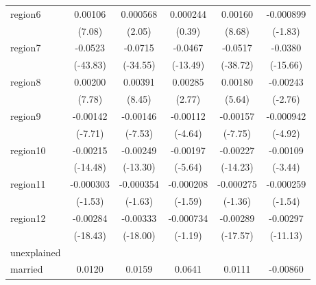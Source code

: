 \begin{table}[htbp]
\begin{tabular}{l*{5}{c}}
region6     &     0.00106\sym{***}&    0.000568\sym{*}  &    0.000244         &     0.00160\sym{***}&   -0.000899         \\
            &      (7.08)         &      (2.05)         &      (0.39)         &      (8.68)         &     (-1.83)         \\
region7     &     -0.0523\sym{***}&     -0.0715\sym{***}&     -0.0467\sym{***}&     -0.0517\sym{***}&     -0.0380\sym{***}\\
            &    (-43.83)         &    (-34.55)         &    (-13.49)         &    (-38.72)         &    (-15.66)         \\
region8     &     0.00200\sym{***}&     0.00391\sym{***}&     0.00285\sym{**} &     0.00180\sym{***}&    -0.00243\sym{**} \\
            &      (7.78)         &      (8.45)         &      (2.77)         &      (5.64)         &     (-2.76)         \\
region9     &    -0.00142\sym{***}&    -0.00146\sym{***}&    -0.00112\sym{***}&    -0.00157\sym{***}&   -0.000942\sym{***}\\
            &     (-7.71)         &     (-7.53)         &     (-4.64)         &     (-7.75)         &     (-4.92)         \\
region10    &    -0.00215\sym{***}&    -0.00249\sym{***}&    -0.00197\sym{***}&    -0.00227\sym{***}&    -0.00109\sym{***}\\
            &    (-14.48)         &    (-13.30)         &     (-5.64)         &    (-14.23)         &     (-3.44)         \\
region11    &   -0.000303         &   -0.000354         &   -0.000208         &   -0.000275         &   -0.000259         \\
            &     (-1.53)         &     (-1.63)         &     (-1.59)         &     (-1.36)         &     (-1.54)         \\
region12    &    -0.00284\sym{***}&    -0.00333\sym{***}&   -0.000734         &    -0.00289\sym{***}&    -0.00297\sym{***}\\
            &    (-18.43)         &    (-18.00)         &     (-1.19)         &    (-17.57)         &    (-11.13)         \\
\hline
unexplained &                     &                     &                     &                     &                     \\
married     &      0.0120         &      0.0159         &      0.0641\sym{*}  &      0.0111         &    -0.00860         \\

\end{tabular}
\end{table}
